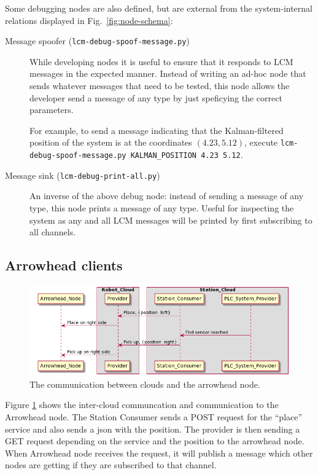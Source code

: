 Some debugging nodes are also defined, but are external from the system-internal relations displayed in Fig.~\ref{fig:node-schema}:
\begin{description}
\item[Message spoofer (\texttt{lcm-debug-spoof-message.py})]
  While developing nodes it is useful to ensure that it responds to LCM messages in the expected manner.
  Instead of writing an ad-hoc node that sends whatever messages that need to be tested,
  this node allows the developer send a message of any type by just speficying the correct parameters.


  For example, to send a message indicating that the Kalman-filtered position of the system is at the coordinates $(4.23, 5.12)$,
  execute \texttt{lcm-debug-spoof-message.py KALMAN\_POSITION 4.23 5.12}.

\item[Message sink (\texttt{lcm-debug-print-all.py})]
  An inverse of the above debug node: instead of sending a message of any type,
  this node prints a message of any type.
  Useful for inspecting the system as any and all LCM messages will be printed by first subscribing to all channels.
\end{description}

\subsection{Arrowhead clients}

\begin{figure}[h!]
	\centering
	\includegraphics[scale=0.3]{sections/assets/arrowhead_sequence_diagram.png}
	\caption{The communication between clouds and the arrowhead node.}
	\label{fig:arrowhead_intercloud}
\end{figure}

Figure \ref{fig:arrowhead_intercloud} shows the inter-cloud communcation and communication to the Arrowhead node.  
The Station Consumer sends a POST request for the ``place'' service and also sends a json with the position.  
The provider is then sending a GET request depending on the service and the position to the arrowhead node.  
When Arrowhead node receives the request, it will publish a message which other nodes are getting if they are subscribed to that channel.

